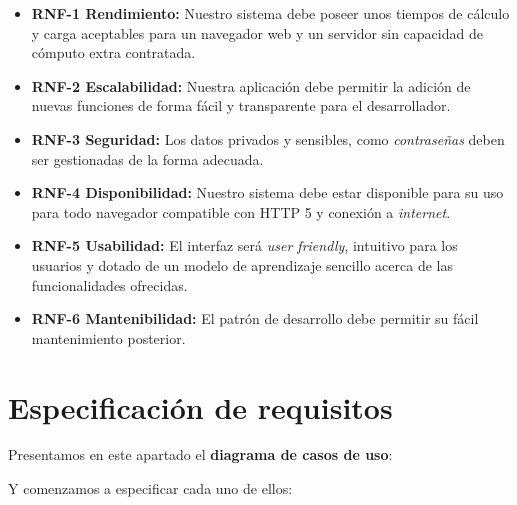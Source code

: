\begin{itemize}
    \item \textbf{RNF-1 Rendimiento:} Nuestro sistema debe poseer unos tiempos de cálculo y carga aceptables para un navegador web y un servidor sin capacidad de cómputo extra contratada.
    \item \textbf{RNF-2 Escalabilidad:} Nuestra aplicación debe permitir la adición de nuevas funciones de forma fácil y transparente para el desarrollador.
    \item \textbf{RNF-3 Seguridad:} Los datos privados y sensibles, como \textit{contraseñas} deben ser gestionadas de la forma adecuada.
    \item \textbf{RNF-4 Disponibilidad:} Nuestro sistema debe estar disponible para su uso para todo navegador compatible con HTTP 5 y conexión a \textit{internet}.
    \item \textbf{RNF-5 Usabilidad:} El interfaz será \textit{user friendly}, intuitivo para los usuarios y dotado de un modelo de aprendizaje sencillo acerca de las funcionalidades ofrecidas.
    \item \textbf{RNF-6 Mantenibilidad:} El patrón de desarrollo debe permitir su fácil mantenimiento posterior.
\end{itemize}


\section{Especificación de requisitos}

Presentamos en este apartado el \textbf{diagrama de casos de uso}:


Y comenzamos a especificar cada uno de ellos:

